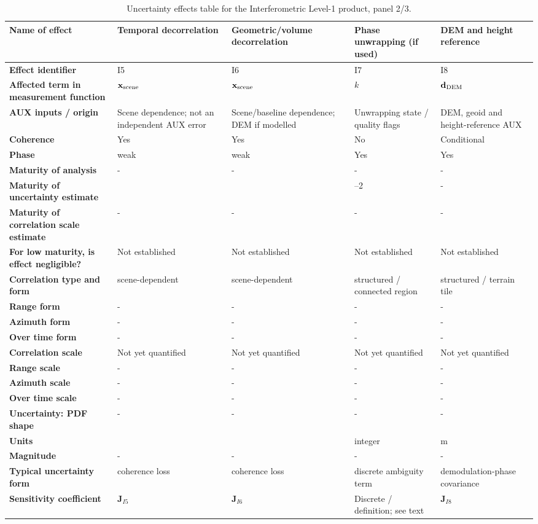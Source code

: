 \begin{table}[p]
\centering\scriptsize
\renewcommand{\arraystretch}{1.1}
\caption{Uncertainty effects table for the Interferometric Level-1 product, panel 2/3.}
\label{tab:insar_effects_table_proposed_2}
\begin{tabularx}{\textwidth}{|>{\raggedright\arraybackslash}p{3.0cm}|*{4}{>{\raggedright\arraybackslash}X|}}\hline
\textbf{Name of effect} & Temporal decorrelation & Geometric/volume decorrelation & Phase unwrapping (if used) & DEM and height reference \\ \hline
\textbf{Effect identifier} & I5 & I6 & I7 & I8 \\ \hline
\textbf{Affected term in measurement function} & $\mathbf x_{\rm scene}$ & $\mathbf x_{\rm scene}$ & $k$ & $\mathbf d_{\rm DEM}$ \\ \hline
\textbf{AUX inputs / origin} & Scene dependence; not an independent AUX error & Scene/baseline dependence; DEM if modelled & Unwrapping state / quality flags & DEM, geoid and height-reference AUX \\ \hline
\textbf{Coherence} & Yes & Yes & No & Conditional \\ \hline
\textbf{Phase} & weak & weak & Yes & Yes \\ \hline
\textbf{Maturity of analysis} & - & - & - & - \\ \hline
\textbf{Maturity of uncertainty estimate} & 2 & 2 & 1--2 & - \\ \hline
\textbf{Maturity of correlation scale estimate} & - & - & - & - \\ \hline
\textbf{For low maturity, is effect negligible?} & Not established & Not established & Not established & Not established \\ \hline
\textbf{Correlation type and form} & scene-dependent & scene-dependent & structured / connected region & structured / terrain tile \\ \hline
\textbf{Range form} & - & - & - & - \\ \hline
\textbf{Azimuth form} & - & - & - & - \\ \hline
\textbf{Over time form} & - & - & - & - \\ \hline
\textbf{Correlation scale} & Not yet quantified & Not yet quantified & Not yet quantified & Not yet quantified \\ \hline
\textbf{Range scale} & - & - & - & - \\ \hline
\textbf{Azimuth scale} & - & - & - & - \\ \hline
\textbf{Over time scale} & - & - & - & - \\ \hline
\textbf{Uncertainty: PDF shape} & - & - & - & - \\ \hline
\textbf{Units} & 1 & 1 & integer & m \\ \hline
\textbf{Magnitude} & - & - & - & - \\ \hline
\textbf{Typical uncertainty form} & coherence loss & coherence loss & discrete ambiguity term & demodulation-phase covariance \\ \hline
\textbf{Sensitivity coefficient} & $\mathbf J_{I5}$ & $\mathbf J_{I6}$ & Discrete / definition; see text & $\mathbf J_{I8}$ \\ \hline
\end{tabularx}
\end{table}
